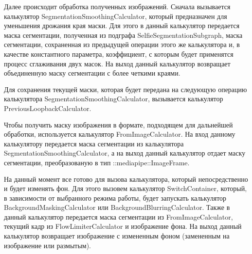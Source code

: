 \documentclass[a4paper,14pt]{extreport}
\begin{document}
        Далее происходит обработка полученных изображений. Сначала вызывается калькулятор SegmentationSmoothingCalculator, который предназначен для уменьшения дрожания края маски. Для этого в данный калькулятор передается маска сегментации, полученная из подграфа SelfieSegmentationSubgraph, маска сегментации, сохраненная из предыдущей операции этого же калькулятора и, в качестве константного параметра, коэффициент, с которым будет применятся процесс сглаживания двух масок. На выход данный калькулятор возвращает объединенную маску сегментации с более четкими краями.
        

        Для сохранения текущей маски, которая будет передана на следующую операцию калькулятора SegmentationSmoothingCalculator, вызывается калькулятор PreviousLoopbackCalculator.
        

        Чтобы получить маску изображения в формате, подходящем для дальнейшей обработки, используется калькулятор FromImageCalculator. На вход данному калькулятору передается маска сегментации из калькулятора SegmentationSmoothingCalculator, а на выход данный калькулятор отдает маску сегментации, преобразованую в тип ::mediapipe::ImageFrame.
        

        На данный момент все готово для вызова калькулятора, который непосредственно и будет изменять фон. Для этого вызовем калькулятор SwitchContainer, который, в зависимости от выбранного режима работы, будет запускать калькулятор BackgroundMaskingCalculator или BackgroundBlurringCalculator. Также в данный калькулятор передается маска сегментации из FromImageCalculator, текущий кадр из FlowLimiterCalculator и изображение фона. На выход данный калькулятор возвращает изображение с измененным фоном (замененным на изображение или размытым).
        
\end{document}
